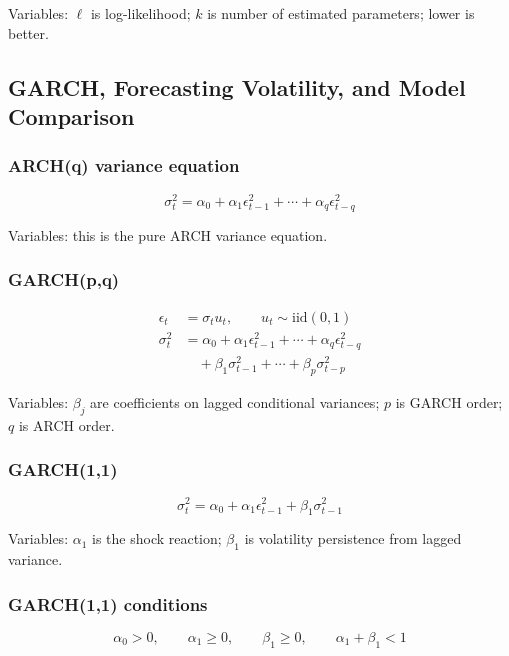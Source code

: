 \documentclass[
  8pt,
  twocolumn]{extarticle}
\begin{document}
Variables: \(\ell\) is log-likelihood; \(k\) is number of estimated
parameters; lower is better.

\subsection{GARCH, Forecasting Volatility, and Model
Comparison}\label{garch-forecasting-volatility-and-model-comparison}

\subsubsection{ARCH(q) variance equation}\label{archq-variance-equation}

\[
\sigma_t^2=\alpha_0+\alpha_1\epsilon_{t-1}^2+\cdots+\alpha_q\epsilon_{t-q}^2
\]

Variables: this is the pure ARCH variance equation.

\subsubsection{GARCH(p,q)}\label{garchpq}

\[
\begin{aligned}
\epsilon_t&=\sigma_tu_t,\qquad u_t\sim\mathrm{iid}(0,1)\\
\sigma_t^2&=\alpha_0+\alpha_1\epsilon_{t-1}^2+\cdots+\alpha_q\epsilon_{t-q}^2\\
&\quad+\beta_1\sigma_{t-1}^2+\cdots+\beta_p\sigma_{t-p}^2
\end{aligned}
\]

Variables: \(\beta_j\) are coefficients on lagged conditional variances;
\(p\) is GARCH order; \(q\) is ARCH order.

\subsubsection{GARCH(1,1)}\label{garch11}

\[
\sigma_t^2=\alpha_0+\alpha_1\epsilon_{t-1}^2+\beta_1\sigma_{t-1}^2
\]

Variables: \(\alpha_1\) is the shock reaction; \(\beta_1\) is volatility
persistence from lagged variance.

\subsubsection{GARCH(1,1) conditions}\label{garch11-conditions}

\[
\alpha_0>0,\qquad \alpha_1\ge0,\qquad \beta_1\ge0,\qquad \alpha_1+\beta_1<1
\]
\end{document}
